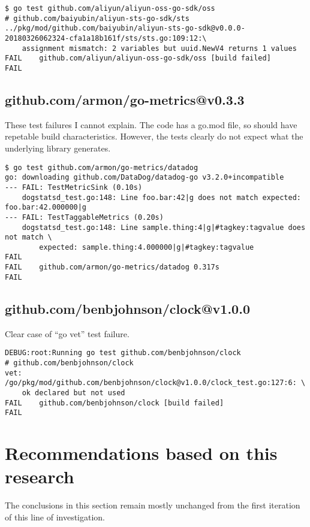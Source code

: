 \documentclass[a4paper]{paper}
\begin{document}
\begin{verbatim}
$ go test github.com/aliyun/aliyun-oss-go-sdk/oss
# github.com/baiyubin/aliyun-sts-go-sdk/sts
../pkg/mod/github.com/baiyubin/aliyun-sts-go-sdk@v0.0.0-20180326062324-cfa1a18b161f/sts/sts.go:109:12:\
    assignment mismatch: 2 variables but uuid.NewV4 returns 1 values
FAIL	github.com/aliyun/aliyun-oss-go-sdk/oss [build failed]
FAIL
\end{verbatim}

\subsection{github.com/armon/go-metrics@v0.3.3}

These test failures I cannot explain. The code has a go.mod file, so
should have repetable build characteristics. However, the tests
clearly do not expect what the underlying library generates.

\begin{verbatim}
$ go test github.com/armon/go-metrics/datadog
go: downloading github.com/DataDog/datadog-go v3.2.0+incompatible
--- FAIL: TestMetricSink (0.10s)
    dogstatsd_test.go:148: Line foo.bar:42|g does not match expected: foo.bar:42.000000|g
--- FAIL: TestTaggableMetrics (0.20s)
    dogstatsd_test.go:148: Line sample.thing:4|g|#tagkey:tagvalue does not match \
        expected: sample.thing:4.000000|g|#tagkey:tagvalue
FAIL
FAIL	github.com/armon/go-metrics/datadog	0.317s
FAIL
\end{verbatim}

\subsection{github.com/benbjohnson/clock@v1.0.0}

Clear case of ``go vet'' test failure.

\begin{verbatim}
DEBUG:root:Running go test github.com/benbjohnson/clock
# github.com/benbjohnson/clock
vet: /go/pkg/mod/github.com/benbjohnson/clock@v1.0.0/clock_test.go:127:6: \
    ok declared but not used
FAIL	github.com/benbjohnson/clock [build failed]
FAIL
\end{verbatim}

\section{Recommendations based on this research}

The conclusions in this section remain mostly unchanged from the first
iteration of this line of investigation.
\end{document}
